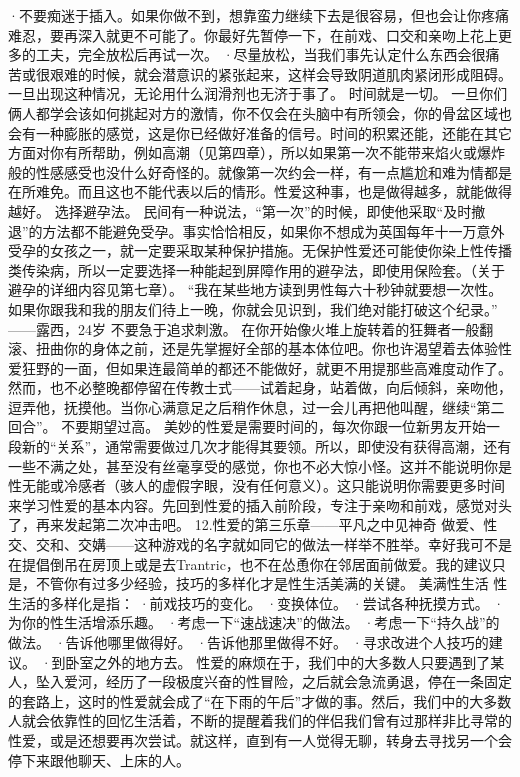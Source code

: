\documentclass[12pt,UTF8]{ctexbook}
\begin{document}
·不要痴迷于插入。如果你做不到，想靠蛮力继续下去是很容易，但也会让你疼痛难忍，要再深入就更不可能了。你最好先暂停一下，在前戏、口交和亲吻上花上更多的工夫，完全放松后再试一次。
·尽量放松，当我们事先认定什么东西会很痛苦或很艰难的时候，就会潜意识的紧张起来，这样会导致阴道肌肉紧闭形成阻碍。一旦出现这种情况，无论用什么润滑剂也无济于事了。
时间就是一切。
一旦你们俩人都学会该如何挑起对方的激情，你不仅会在头脑中有所领会，你的骨盆区域也会有一种膨胀的感觉，这是你已经做好准备的信号。时间的积累还能，还能在其它方面对你有所帮助，例如高潮（见第四章），所以如果第一次不能带来焰火或爆炸般的性感感受也没什么好奇怪的。就像第一次约会一样，有一点尴尬和难为情都是在所难免。而且这也不能代表以后的情形。性爱这种事，也是做得越多，就能做得越好。
选择避孕法。
民间有一种说法，“第一次”的时候，即使他采取“及时撤退”的方法都不能避免受孕。事实恰恰相反，如果你不想成为英国每年十一万意外受孕的女孩之一，就一定要采取某种保护措施。无保护性爱还可能使你染上性传播类传染病，所以一定要选择一种能起到屏障作用的避孕法，即使用保险套。（关于避孕的详细内容见第七章）。
“我在某些地方读到男性每六十秒钟就要想一次性。如果你跟我和我的朋友们待上一晚，你就会见识到，我们绝对能打破这个纪录。”
——露西，24岁
不要急于追求刺激。
在你开始像火堆上旋转着的狂舞者一般翻滚、扭曲你的身体之前，还是先掌握好全部的基本体位吧。你也许渴望着去体验性爱狂野的一面，但如果连最简单的都还不能做好，就更不用提那些高难度动作了。然而，也不必整晚都停留在传教士式——试着起身，站着做，向后倾斜，亲吻他，逗弄他，抚摸他。当你心满意足之后稍作休息，过一会儿再把他叫醒，继续“第二回合”。
不要期望过高。
美妙的性爱是需要时间的，每次你跟一位新男友开始一段新的“关系”，通常需要做过几次才能得其要领。所以，即使没有获得高潮，还有一些不满之处，甚至没有丝毫享受的感觉，你也不必大惊小怪。这并不能说明你是性无能或冷感者（骇人的虚假字眼，没有任何意义）。这只能说明你需要更多时间来学习性爱的基本内容。先回到性爱的插入前阶段，专注于亲吻和前戏，感觉对头了，再来发起第二次冲击吧。
12.性爱的第三乐章——平凡之中见神奇
做爱、性交、交和、交媾——这种游戏的名字就如同它的做法一样举不胜举。幸好我可不是在提倡倒吊在房顶上或是去Trantric，也不在怂恿你在邻居面前做爱。我的建议只是，不管你有过多少经验，技巧的多样化才是性生活美满的关键。
美满性生活
性生活的多样化是指：
·前戏技巧的变化。
·变换体位。
·尝试各种抚摸方式。
·为你的性生活增添乐趣。
·考虑一下“速战速决”的做法。
·考虑一下“持久战”的做法。
·告诉他哪里做得好。
·告诉他那里做得不好。
·寻求改进个人技巧的建议。
·到卧室之外的地方去。
性爱的麻烦在于，我们中的大多数人只要遇到了某人，坠入爱河，经历了一段极度兴奋的性冒险，之后就会急流勇退，停在一条固定的套路上，这时的性爱就会成了“在下雨的午后”才做的事。然后，我们中的大多数人就会依靠性的回忆生活着，不断的提醒着我们的伴侣我们曾有过那样非比寻常的性爱，或是还想要再次尝试。就这样，直到有一人觉得无聊，转身去寻找另一个会停下来跟他聊天、上床的人。
\end{document}
